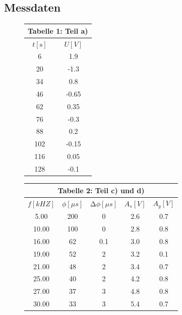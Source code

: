 \subsection{Messdaten}
    \begin{figure}[H]
        \hspace*{1cm}
        \begin{minipage}{0.3\textwidth}
        \vspace*{-3.35cm}
        \begin{tabular}{cc}
        \multicolumn{2}{c}{\textbf{Tabelle 1:} Teil a)} \\
        \midrule
        $t[\si{\second}]$ & $U[V]$  \\
        \midrule
        6   &   1.9     \\
        20  &   -1.3    \\
        34  &   0.8     \\
        46  &   -0.65   \\
        62  &   0.35    \\
        76  &   -0.3    \\
        88  &   0.2     \\
        102 &   -0.15   \\
        116 &   0.05    \\
        128 &   -0.1    \\ 
        \end{tabular}
        \end{minipage}
        \begin{minipage}{0.2\textwidth}
        \begin{tabular}{c c c c c}
        \multicolumn{5}{c}{\textbf{Tabelle 2:} Teil c) und d)} \\
        \midrule
        $f[kHZ]$ & $\phi[\mu s]$ & $\increment \phi[\mu s]$ & $A_s[V]$ & $A_g[V]$ \\ 
        \midrule
        5.00   &  200  &  0    &  2.6   &  0.7 \\
        10.00  &  100  &  0    &  2.8   &  0.8 \\
        16.00  &  62   &  0.1  &  3.0   &  0.8 \\
        19.00  &  52   &  2    &  3.2   &  0.1 \\
        21.00  &  48   &  2    &  3.4   &  0.7 \\
        25.00  &  40   &  2    &  4.2   &  0.8 \\
        27.00  &  37   &  3    &  4.8   &  0.8 \\
        30.00  &  33   &  3    &  5.4   &  0.7 \\

\end{tabular}
\end{minipage}
\end{figure}
